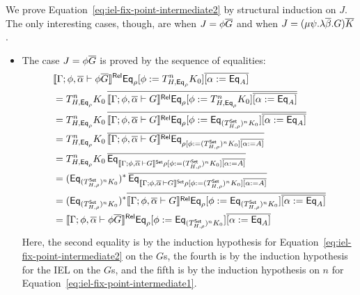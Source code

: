 \documentclass{lmcs}
\theoremstyle{plain}\newtheorem{satz}[thm]{Satz}
\newcommand{\set}{\mathsf{Set}}
\begin{document}
\begin{itemize}
\vspace*{0.1in}

We prove Equation~\ref{eq:iel-fix-point-intermediate2} by structural
induction on $J$. The only interesting cases, though, are when $J =
\phi \overline{G}$ and when $J = (\mu \psi.\lambda \overline{\beta}. G)\overline{K}$.
\begin{itemize}
\item The case $J = \phi \overline{G}$ is proved by the sequence of equalities:
\[
\begin{split}
& \relsem{\Gamma; \phi, \ol{\alpha} \vdash \phi
    \ol{G}} \Eq_{\rho} [\phi := T^{n}_{H,\Eq_{\rho}} K_0]
  \overline{[\alpha := \Eq_A]}
  \\
&= T^{n}_{H,\Eq_{\rho}} K_0\, \overline{\relsem{\Gamma; 
      \phi, \ol{\alpha} \vdash G} \Eq_{\rho} [\phi :=
      T^{n}_{H,\Eq_{\rho}} K_0] \overline{[\alpha :=
        \Eq_A]}} \\ 
&= T^{n}_{H,\Eq_{\rho}} K_0\, \overline{\relsem{\Gamma; 
      \phi, \ol{\alpha} \vdash G} \Eq_{\rho} [\phi :=
      \Eq_{(T^\set_{H,\rho})^{n} K_0}] \overline{[\alpha :=
        \Eq_A]}} \\ 
&= T^{n}_{H,\Eq_{\rho}} K_0\, \overline{\relsem{\Gamma; 
      \phi, \ol{\alpha} \vdash G} \Eq_{\rho [\phi := (T^\set_{H,\rho})^{n}
        K_0] \overline{[\alpha := A]}}} \\ 
&= T^{n}_{H,\Eq_{\rho}} K_0\, \overline{\Eq_{\setsem{\Gamma;
        \phi, \ol{\alpha} \,\vdash G} \rho [\phi :=
        (T^\set_{H,\rho})^{n} K_0] \overline{[\alpha :=
          A]}}} \\ 
&= (\Eq_{(T^\set_{H,\rho})^{n} K_0})^* \,\overline{\Eq_{\setsem{\Gamma;
        \phi, \ol{\alpha} \,\vdash G} \rho [\phi :=
        (T^\set_{H,\rho})^{n} K_0] \overline{[\alpha :=
          A]}}} \\ 
&= (\Eq_{(T^\set_{H,\rho})^{n} K_0})^* \overline{\relsem{\Gamma;
      \phi, \ol{\alpha} \vdash G} \Eq_{\rho} [\phi :=
      \Eq_{(T^\set_{H,\rho})^{n} K_0}] \overline{[\alpha :=
        \Eq_A]}} \\ 
&= \relsem{\Gamma; \phi, \ol{\alpha} \vdash \phi \ol{G}}
  \Eq_{\rho} [\phi := \Eq_{(T^\set_{H,\rho})^{n} K_0}]
  \overline{[\alpha := \Eq_A]} 
\end{split}
\]
Here, the second equality is by the induction hypothesis for
Equation~\ref{eq:iel-fix-point-intermediate2} on the $G$s, the fourth
is by the induction hypothesis for the IEL on the $G$s, and the fifth
is by the induction hypothesis on $n$ for
Equation~\ref{eq:iel-fix-point-intermediate1}.


\end{itemize}
\end{itemize}
\end{document}
